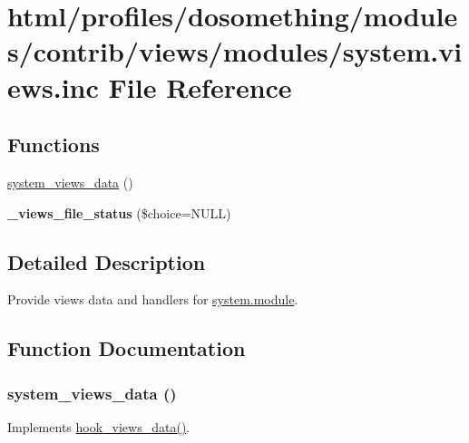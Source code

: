 \hypertarget{system_8views_8inc}{
\section{html/profiles/dosomething/modules/contrib/views/modules/system.views.inc File Reference}
\label{system_8views_8inc}
}
\subsection*{Functions}
\begin{DoxyCompactItemize}
\item 
\hyperlink{system_8views_8inc_a9720aa1df32a1efc1bdaaf6f372c38c3}{system\_\-views\_\-data} ()
\item 
\hypertarget{system_8views_8inc_adbb8ffa6a78abd312f9145c6f2ec3403}{
{\bfseries \_\-views\_\-file\_\-status} (\$choice=NULL)}
\label{system_8views_8inc_adbb8ffa6a78abd312f9145c6f2ec3403}

\end{DoxyCompactItemize}


\subsection{Detailed Description}
Provide views data and handlers for \hyperlink{system_8module}{system.module}. 

\subsection{Function Documentation}
\hypertarget{system_8views_8inc_a9720aa1df32a1efc1bdaaf6f372c38c3}{
\subsubsection[{system\_\-views\_\-data}]{\setlength{\rightskip}{0pt plus 5cm}system\_\-views\_\-data ()}}
\label{system_8views_8inc_a9720aa1df32a1efc1bdaaf6f372c38c3}
Implements \hyperlink{group__views__hooks_ga227057901681e4a33e33c199c7a8c989}{hook\_\-views\_\-data()}. 